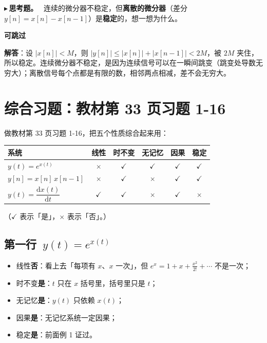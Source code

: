 \documentclass[UTF8,a4paper,11pt]{ctexart}
\newenvironment{skippable}{\begin{skipbox}\textbf{可跳过}\par\smallskip}{\end{skipbox}}
\newcounter{ex}[section]
\newcommand{\point}[1]{\par\addvspace{1ex}\noindent\textcolor{ptteal}{$\blacktriangleright$\,\textbf{#1}}\ }
\begin{document}
\point{思考题。}
连续的微分器不稳定，但\textbf{离散的微分器}（差分 $y[n]=x[n]-x[n-1]$）是\textbf{稳定}的，想一想为什么。

\begin{skippable}
\textbf{解答}：设 $|x[n]|<M$，则 $|y[n]|\le|x[n]|+|x[n-1]|<2M$，被 $2M$ 夹住，所以稳定。连续微分器不稳定，是因为连续信号可以在一瞬间跳变（跳变处导数无穷大）；离散信号每个点都是有限的数，相邻两点相减，差不会无穷大。
\end{skippable}

\section{综合习题：教材第 33 页习题 1-16}
做教材第 33 页习题 1-16，把五个性质综合起来用：

\begin{center}
\renewcommand{\arraystretch}{1.35}
\begin{tabular}{@{}lccccc@{}}
\toprule
系统 & 线性 & 时不变 & 无记忆 & 因果 & 稳定\\
\midrule
$y(t)=e^{x(t)}$ & $\times$ & $\checkmark$ & $\checkmark$ & $\checkmark$ & $\checkmark$\\
$y[n]=x[n]\,x[n-1]$ & $\times$ & $\checkmark$ & $\times$ & $\checkmark$ & $\checkmark$\\
$y(t)=\dfrac{\mathrm{d}x(t)}{\mathrm{d}t}$ & $\checkmark$ & $\checkmark$ & $\times$ & $\checkmark$ & $\times$\\
\bottomrule
\end{tabular}
\end{center}
（$\checkmark$ 表示「是」，$\times$ 表示「否」。）

\subsection{第一行~\texorpdfstring{$y(t)=e^{x(t)}$}{y(t)=exp(x(t))}}
\begin{itemize}[nosep]
\item 线性\textbf{否}：看上去「每项有 $x$、$x$ 一次」，但 $e^{x}=1+x+\tfrac{x^2}{2!}+\cdots$ 不是一次；
\item 时不变\textbf{是}：$t$ 只在 $x$ 括号里，括号里只是 $t$；
\item 无记忆\textbf{是}：$y(t)$ 只依赖 $x(t)$；
\item 因果\textbf{是}：无记忆系统一定因果；
\item 稳定\textbf{是}：前面例 1 证过。
\end{itemize}
\end{document}
